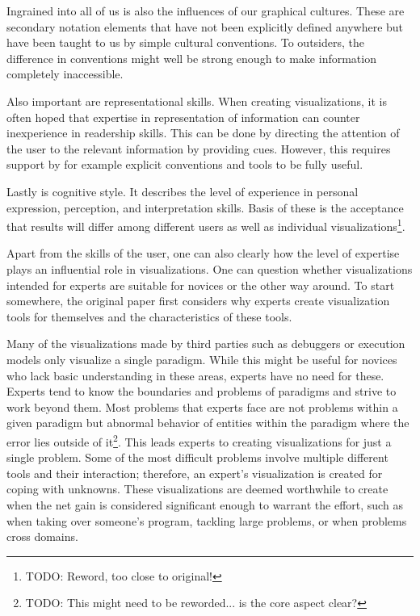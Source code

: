 \documentclass[11pt, a4paper, ngerman, twoside]{article}
\theoremstyle{plain}\newtheorem{Lemma}{Lemma}
\theoremstyle{plain}\newtheorem{Satz}[Lemma]{Satz}
\theoremstyle{definition}\newtheorem{Definition}[Lemma]{Definition}
\theoremstyle{definition}\newtheorem*{Beispiel}{Beispiel}
\theoremstyle{remark}\newtheorem*{Bemerkung}{Bemerkung}
\begin{document}
Ingrained into all of us is also the influences of our graphical cultures. These are secondary notation elements that have not been explicitly defined anywhere but have been taught to us by simple cultural conventions. To outsiders, the difference in conventions might well be strong enough to make information completely inaccessible.

Also important are representational skills. When creating visualizations, it is often hoped that expertise in representation of information can counter inexperience in readership skills. This can be done by directing the attention of the user to the relevant information by providing cues. However, this requires support by for example explicit conventions and tools to be fully useful.

Lastly is cognitive style. It describes the level of experience in personal expression, perception, and interpretation skills. Basis of these is the acceptance that results will differ among different users as well as individual visualizations\footnote{TODO: Reword, too close to original!}.

Apart from the skills of the user, one can also clearly how the level of expertise plays an influential role in visualizations. One can question whether visualizations intended for experts are suitable for novices or the other way around. To start somewhere, the original paper first considers why experts create visualization tools for themselves and the characteristics of these tools.

Many of the visualizations made by third parties such as debuggers or execution models only visualize a single paradigm. While this might be useful for novices who lack basic understanding in these areas, experts have no need for these. Experts tend to know the boundaries and problems of paradigms and strive to work beyond them. Most problems that experts face are not problems within a given paradigm but abnormal behavior of entities within the paradigm where the error lies outside of it\footnote{TODO: This might need to be reworded... is the core aspect clear?}. This leads experts to creating visualizations for just a single problem. Some of the most difficult problems involve multiple different tools and their interaction; therefore, an expert's visualization is created for coping with unknowns. These visualizations are deemed worthwhile to create when the net gain is considered significant enough to warrant the effort, such as when taking over someone's program, tackling large problems, or when problems cross domains.
\end{document}
